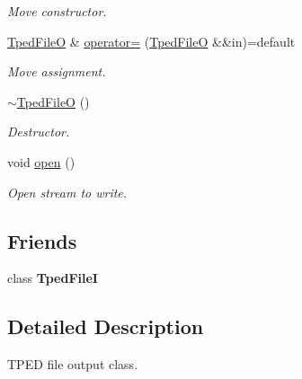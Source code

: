 \begin{DoxyCompactItemize}
\begin{DoxyCompactList}\small\item\em Move constructor. \end{DoxyCompactList}\item 
\mbox{\label{classsamp_files_1_1_tped_file_o_a95672cf7ee43323a01aac99ed0da1434}} 
\hyperlink{classsamp_files_1_1_tped_file_o}{Tped\+FileO} \& \hyperlink{classsamp_files_1_1_tped_file_o_a95672cf7ee43323a01aac99ed0da1434}{operator=} (\hyperlink{classsamp_files_1_1_tped_file_o}{Tped\+FileO} \&\&in)=default
\begin{DoxyCompactList}\small\item\em Move assignment. \end{DoxyCompactList}\item 
\mbox{\label{classsamp_files_1_1_tped_file_o_a72c180551c4b5316b6004e4336333fbd}} 
\hyperlink{classsamp_files_1_1_tped_file_o_a72c180551c4b5316b6004e4336333fbd}{$\sim$\+Tped\+FileO} ()
\begin{DoxyCompactList}\small\item\em Destructor. \end{DoxyCompactList}\item 
\mbox{\label{classsamp_files_1_1_tped_file_o_a51ebb1d2bfe493583ed7c5b511b238b1}} 
void \hyperlink{classsamp_files_1_1_tped_file_o_a51ebb1d2bfe493583ed7c5b511b238b1}{open} ()
\begin{DoxyCompactList}\small\item\em Open stream to write. \end{DoxyCompactList}\end{DoxyCompactItemize}
\subsection*{Friends}
\begin{DoxyCompactItemize}
\item 
\mbox{\label{classsamp_files_1_1_tped_file_o_aeb47e2986d7ad000d56308d882625f34}} 
class {\bfseries Tped\+FileI}
\end{DoxyCompactItemize}


\subsection{Detailed Description}
T\+P\+ED file output class. 

